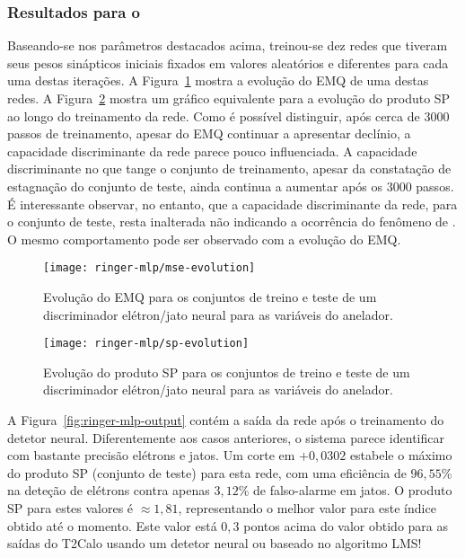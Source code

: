 \subsubsection{Resultados para o }

Baseando-se nos parâmetros destacados acima, treinou-se dez redes que tiveram
seus pesos sinápticos iniciais fixados em valores aleatórios e diferentes para
cada uma destas iterações. A Figura~\ref{fig:ringer-mlp-mse} mostra a evolução
do EMQ de uma destas redes. A Figura~\ref{fig:ringer-mlp-sp} mostra um gráfico
equivalente para a evolução do produto SP ao longo do treinamento da
rede. Como é possível distinguir, após cerca de 3000 passos de treinamento,
apesar do EMQ continuar a apresentar declínio, a capacidade discriminante da
rede parece pouco influenciada. A capacidade discriminante no que tange o
conjunto de treinamento, apesar da constatação de estagnação do conjunto de
teste, ainda continua a aumentar após os 3000 passos. É interessante observar,
no entanto, que a capacidade discriminante da rede, para o conjunto de teste,
resta inalterada não indicando a ocorrência do fenômeno de
. O mesmo comportamento pode ser observado com a evolução do
EMQ.

\begin{figure}
\begin{center}
\texttt{[image: ringer-mlp/mse-evolution]}
\end{center}
\caption{Evolução do EMQ para os conjuntos de treino e teste de um
discriminador elétron/jato neural para as variáveis do anelador.}
\label{fig:ringer-mlp-mse}
\end{figure}

\begin{figure}
\begin{center}
\texttt{[image: ringer-mlp/sp-evolution]}
\end{center}
\caption{Evolução do produto SP para os conjuntos de treino e teste de um
discriminador elétron/jato neural para as variáveis do anelador.}
\label{fig:ringer-mlp-sp}
\end{figure}

A Figura~\ref{fig:ringer-mlp-output} contém a saída da rede após o treinamento
do detetor neural. Diferentemente aos casos anteriores, o sistema parece
identificar com bastante precisão elétrons e jatos. Um corte em $+0,0302$
estabele o máximo do produto SP (conjunto de teste) para esta rede, com uma
eficiência de $96,55$\% na deteção de elétrons contra apenas $3,12$\% de
falso-alarme em jatos. O produto SP para estes valores é $\approx 1,81$,
representando o melhor valor para este índice obtido até o momento. Este valor
está $0,3$ pontos acima do valor obtido para as saídas do T2Calo usando um
detetor neural ou baseado no algoritmo LMS!

